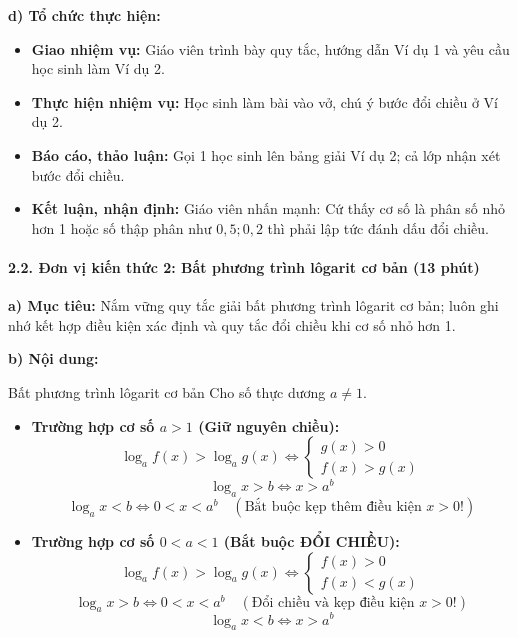 \documentclass[12pt, a4paper]{article}
\begin{document}
\noindent \textbf{d) Tổ chức thực hiện:}
\begin{itemize}[leftmargin=0.6cm]
    \item \textbf{Giao nhiệm vụ:} Giáo viên trình bày quy tắc, hướng dẫn Ví dụ 1 và yêu cầu học sinh làm Ví dụ 2.
    \item \textbf{Thực hiện nhiệm vụ:} Học sinh làm bài vào vở, chú ý bước đổi chiều ở Ví dụ 2.
    \item \textbf{Báo cáo, thảo luận:} Gọi 1 học sinh lên bảng giải Ví dụ 2; cả lớp nhận xét bước đổi chiều.
    \item \textbf{Kết luận, nhận định:} Giáo viên nhấn mạnh: Cứ thấy cơ số là phân số nhỏ hơn 1 hoặc số thập phân như $0{,}5; 0{,}2$ thì phải lập tức đánh dấu đổi chiều.
\end{itemize}

\paragraph{2.2. Đơn vị kiến thức 2: Bất phương trình lôgarit cơ bản (13 phút)}

\noindent \textbf{a) Mục tiêu:}
Nắm vững quy tắc giải bất phương trình lôgarit cơ bản; luôn ghi nhớ kết hợp điều kiện xác định và quy tắc đổi chiều khi cơ số nhỏ hơn 1.

\noindent \textbf{b) Nội dung:}
\begin{pedabox}{Bất phương trình lôgarit cơ bản}
Cho số thực dương $a \neq 1$.
\begin{itemize}[leftmargin=0.6cm]
    \item \textbf{Trường hợp cơ số $a > 1$ (Giữ nguyên chiều):}
    $$\log_a f(x) > \log_a g(x) \iff \begin{cases} g(x) > 0 \\ f(x) > g(x) \end{cases}$$
    $$\log_a x > b \iff x > a^b$$
    $$\log_a x < b \iff 0 < x < a^b \quad (\text{Bắt buộc kẹp thêm điều kiện } x > 0!)$$
    \item \textbf{Trường hợp cơ số $0 < a < 1$ (Bắt buộc ĐỔI CHIỀU):}
    $$\log_a f(x) > \log_a g(x) \iff \begin{cases} f(x) > 0 \\ f(x) < g(x) \end{cases}$$
    $$\log_a x > b \iff 0 < x < a^b \quad (\text{Đổi chiều và kẹp điều kiện } x > 0!)$$
    $$\log_a x < b \iff x > a^b$$
\end{itemize}
\end{pedabox}
\end{document}
